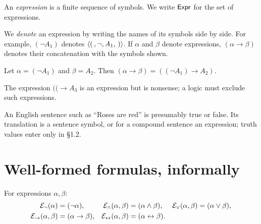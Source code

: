 \documentclass[11pt]{article}
\begin{document}
\begin{definition}[Expression]\label{def:expression}
An \emph{expression} is a finite sequence of symbols. We write $\mathsf{Expr}$ for
the set of expressions.
\end{definition}

\begin{convention}
We \emph{denote} an expression by writing the names of its symbols side by
side. For example, $(\neg A_1)$ denotes $\langle (\,,\neg,A_1,\,)\rangle$. If
$\alpha$ and $\beta$ denote expressions, $(\alpha\to\beta)$ denotes their
concatenation with the symbols shown.
\end{convention}

\begin{example}
Let $\alpha = (\neg A_1)$ and $\beta = A_2$. Then
$(\alpha\to\beta) = ((\neg A_1)\to A_2)$.
\end{example}

\begin{example}
The expression $((\to A_3$ is an expression but is nonsense; a logic must
exclude such expressions.
\end{example}

\begin{remark}[Translation]
An English sentence such as ``Roses are red'' is presumably true or false.
Its translation is a sentence symbol, or for a compound sentence an
expression; truth values enter only in \S1.2.
\end{remark}

\section{Well-formed formulas, informally}

\begin{definition}\label{def:formula-building}
For expressions $\alpha,\beta$:
\begin{align*}
\mathcal{E}_{\neg}(\alpha) &= (\neg\alpha), &
\mathcal{E}_{\land}(\alpha,\beta) &= (\alpha\land\beta), &
\mathcal{E}_{\lor}(\alpha,\beta) &= (\alpha\lor\beta),\\
\mathcal{E}_{\to}(\alpha,\beta) &= (\alpha\to\beta), &
\mathcal{E}_{\leftrightarrow}(\alpha,\beta) &= (\alpha\leftrightarrow\beta).
\end{align*}
\end{definition}
\end{document}
